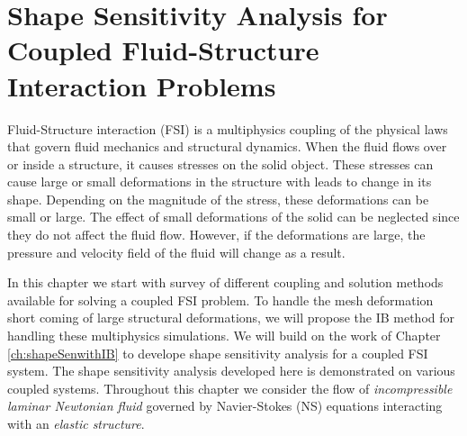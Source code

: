 \chapter{Shape Sensitivity Analysis for Coupled Fluid-Structure Interaction Problems}\label{ch:FSIsen}
Fluid-Structure interaction (FSI) is a multiphysics coupling of the physical laws that govern fluid mechanics and structural dynamics. When the fluid flows over or inside a structure, it causes stresses on the solid object. These stresses can cause large or small deformations in the structure with leads to change in its shape. Depending on the magnitude of the stress, these deformations can be small or large. The effect of small deformations of the solid can be neglected since they do not affect the fluid flow. However, if the deformations are large, the pressure and velocity field of the fluid will change as a result.

In this chapter we start with survey of different coupling and solution methods available for solving a coupled FSI problem. To handle the mesh deformation short coming of large structural deformations, we will propose the IB method for handling these multiphysics simulations. We will build on the work of Chapter \ref{ch:shapeSenwithIB} to develope shape sensitivity analysis for a coupled FSI system. The shape sensitivity analysis developed here is demonstrated on various coupled systems. Throughout this chapter we consider the flow of \emph{incompressible laminar Newtonian fluid} governed by Navier-Stokes (NS) equations interacting with an \emph{elastic structure}. 



